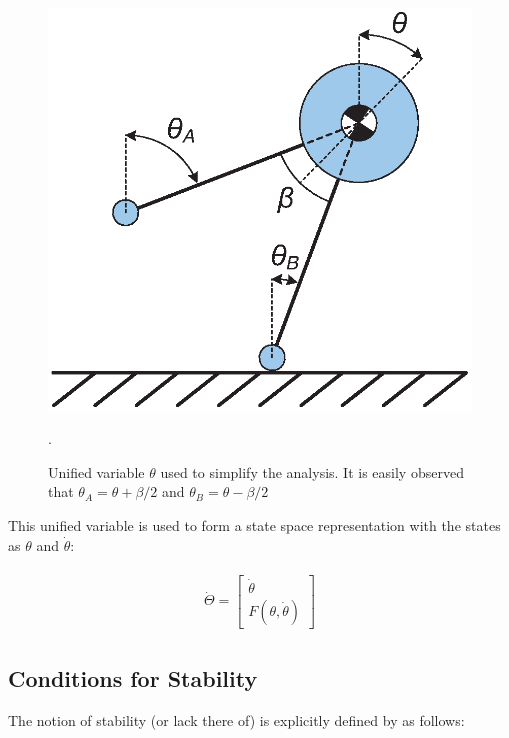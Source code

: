 \begin{figure}[!t]
	\centering
    \includegraphics[scale=0.7]{fig/fpe/fig3.eps} 
  	\caption{Unified variable $\theta$ used to simplify the analysis. It is easily observed that $\theta_A = \theta  + \beta /2$ and $\theta_B = \theta  - \beta /2$}.
	\label{fig:unified}
\end{figure}

This unified variable is used to form a state space representation with the states as $\theta$ and $\dot{\theta}$: 

\begin{equation} \label{ss}
	\begin{aligned}
				\begin{gathered}
  			\dot{\Theta} = \left[ {\begin{array}{*{20}{c}}
  {\dot \theta } \\ 
  {F(\theta, \dot{\theta})} 
							   \end{array}} \right]
		\end{gathered}
	\end{aligned}
\end{equation}

\subsection{Conditions for Stability}
The notion of stability (or lack there of) is explicitly defined by \cite{Wight:2008vt} as follows: 

